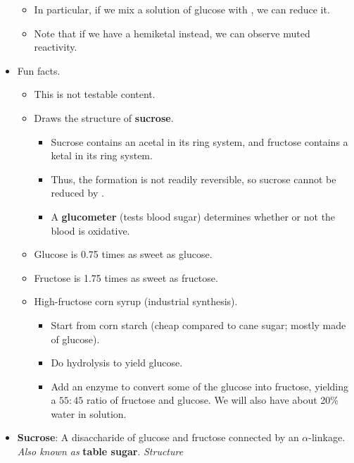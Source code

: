 \documentclass[../notes.tex]{subfiles}
\begin{document}
\begin{itemize}
\begin{itemize}
        \item In particular, if we mix a solution of glucose with , we can reduce it.
        \item Note that if we have a hemiketal instead, we can observe muted reactivity.
    \end{itemize}
    \item Fun facts.
    \begin{itemize}
        \item This is not testable content.
        \item Draws the structure of \textbf{sucrose}.
        \begin{itemize}
            \item Sucrose contains an acetal in its ring system, and fructose contains a ketal in its ring system.
            \item Thus, the formation is not readily reversible, so sucrose cannot be reduced by .
            \item A \textbf{glucometer} (tests blood sugar) determines whether or not the blood is oxidative.
        \end{itemize}
        \item Glucose is 0.75 times as sweet as glucose.
        \item Fructose is 1.75 times as sweet as fructose.
        \item High-fructose corn syrup (industrial synthesis).
        \begin{itemize}
            \item Start from corn starch (cheap compared to cane sugar; mostly made of glucose).
            \item Do hydrolysis to yield glucose.
            \item Add an enzyme to convert some of the glucose into fructose, yielding a $55:45$ ratio of fructose and glucose. We will also have about 20\% water in solution.
        \end{itemize}
    \end{itemize}
    \item \textbf{Sucrose}: A disaccharide of glucose and fructose connected by an $\alpha$-linkage. \emph{Also known as} \textbf{table sugar}. \emph{Structure}
    \begin{figure}[h!]
        \centering
        \footnotesize
\end{figure}
\end{itemize}
\end{document}
